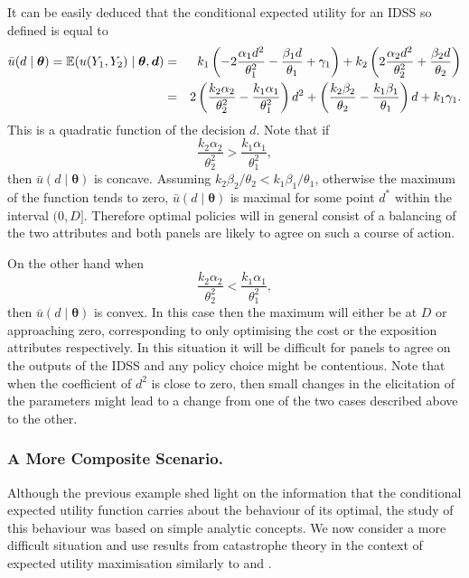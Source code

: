 It can be easily deduced that the conditional expected utility for an IDSS so defined is  equal to
\begin{eqnarray*}
\bar{u}(d\;|\;\bm{\theta})=\mathbb{E}(u(Y_1,Y_2)\;|\;\bm{\theta},\bm{d})&=&k_1\left(-2\frac{\alpha_1d^2}{\theta_1^2}-\frac{\beta_1d}{\theta_1}+\gamma_1\right)+k_2\left(2\frac{\alpha_2d^2}{\theta_2^2}+\frac{\beta_2d}{\theta_2}\right)\\
&=&2\left(\frac{k_2\alpha_2}{\theta_2^2}-\frac{k_1\alpha_1}{\theta_1^2}\right)d^2+\left(\frac{k_2\beta_2}{\theta_2}-\frac{k_1\beta_1}{\theta_1}\right)d+k_1\gamma_1.
\end{eqnarray*}   
This is a quadratic function of the decision $d$. Note that if 
\begin{equation*}
\frac{k_2\alpha_2}{\theta_2^2}>\frac{k_1\alpha_1}{\theta_1^2},
\end{equation*}
then $\bar{u}(d\;|\;\bm{\theta})$ is concave. Assuming $k_2\beta_2/\theta_2<k_1\beta_1/\theta_1$, otherwise the maximum of the function tends to zero, $\bar{u}(d\;|\;\bm{\theta})$ is maximal for some point $d^*$ within the interval $(0,D]$. Therefore optimal policies will in general consist of a balancing of the two attributes and both panels are likely to agree on such a course of action. 

On the other hand when 
\begin{equation*}
\frac{k_2\alpha_2}{\theta_2^2}<\frac{k_1\alpha_1}{\theta_1^2},
\end{equation*}
then $\bar{u}(d\;|\;\bm{\theta})$ is convex. In this case then the maximum will either be at $D$ or approaching zero,  corresponding to only optimising the cost or the exposition attributes respectively. In this situation it will be difficult for panels to agree on the outputs of the IDSS and any policy choice might be contentious. Note that when the coefficient of $d^2$ is close to zero, then small changes in the elicitation of the parameters might lead to a change from one of the two cases described above to the other. 
  
\subsubsection{A More Composite Scenario.}
Although the previous example shed light on the information that the conditional expected utility function carries about the behaviour of its optimal, the study of this behaviour was based on simple analytic concepts. We now consider a more difficult situation and use results from catastrophe theory \citep{Poston2014,Zeeman1979} in the context of expected utility maximisation similarly to \citet{Dodd2012} and \citet{Smith2012}.


